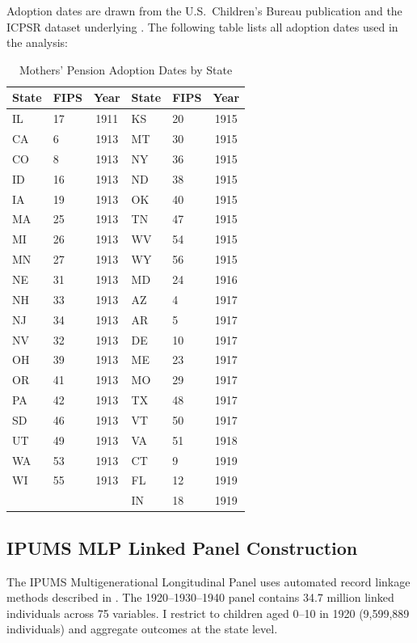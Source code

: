 \documentclass[12pt]{article}
\begin{document}
Adoption dates are drawn from the U.S.\ Children's Bureau publication \citep{thompson1919} and the ICPSR dataset underlying \citet{aizer2016}. The following table lists all adoption dates used in the analysis:

\begin{table}[H]
\centering
\small
\caption{Mothers' Pension Adoption Dates by State}
\begin{tabular}{llc|llc}
\toprule
State & FIPS & Year & State & FIPS & Year \\
\midrule
IL & 17 & 1911 & KS & 20 & 1915 \\
CA & 6 & 1913 & MT & 30 & 1915 \\
CO & 8 & 1913 & NY & 36 & 1915 \\
ID & 16 & 1913 & ND & 38 & 1915 \\
IA & 19 & 1913 & OK & 40 & 1915 \\
MA & 25 & 1913 & TN & 47 & 1915 \\
MI & 26 & 1913 & WV & 54 & 1915 \\
MN & 27 & 1913 & WY & 56 & 1915 \\
NE & 31 & 1913 & MD & 24 & 1916 \\
NH & 33 & 1913 & AZ & 4 & 1917 \\
NJ & 34 & 1913 & AR & 5 & 1917 \\
NV & 32 & 1913 & DE & 10 & 1917 \\
OH & 39 & 1913 & ME & 23 & 1917 \\
OR & 41 & 1913 & MO & 29 & 1917 \\
PA & 42 & 1913 & TX & 48 & 1917 \\
SD & 46 & 1913 & VT & 50 & 1917 \\
UT & 49 & 1913 & VA & 51 & 1918 \\
WA & 53 & 1913 & CT & 9 & 1919 \\
WI & 55 & 1913 & FL & 12 & 1919 \\
    &    &      & IN & 18 & 1919 \\
\bottomrule
\end{tabular}
\label{tab:mp_dates}
\end{table}

\subsection{IPUMS MLP Linked Panel Construction}

The IPUMS Multigenerational Longitudinal Panel uses automated record linkage methods described in \citet{abramitzky2021}. The 1920--1930--1940 panel contains 34.7 million linked individuals across 75 variables. I restrict to children aged 0--10 in 1920 (9,599,889 individuals) and aggregate outcomes at the state level.
\end{document}
